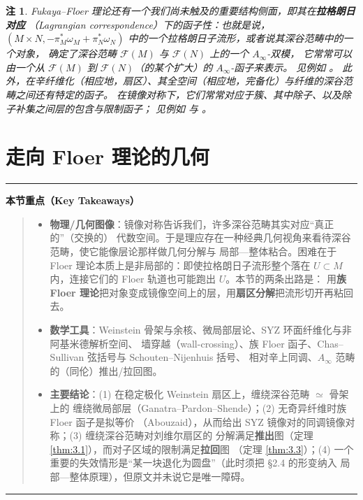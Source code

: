 \documentclass[UTF8,a4paper,11pt,fontset=windows]{ctexart}
\theoremstyle{cnthm}
\newtheorem{rem}[thm]{注}
\numberwithin{equation}{section}
\newenvironment{keytake}%
  {\par\medskip\noindent\rule{\linewidth}{0.5pt}\par\nopagebreak\vspace{3pt}%
   \noindent\textbf{本节重点（Key Takeaways）}\par\nopagebreak\vspace{2pt}%
   \begingroup\setlength{\topsep}{0pt}\setlength{\partopsep}{0pt}%
   \begin{quote}\small\setlength{\itemsep}{2pt}\setlength{\parskip}{0pt}}%
  {\end{quote}\endgroup\vspace{1pt}\noindent\rule{\linewidth}{0.5pt}\par\medskip}
\newcommand{\FF}{\mathcal{F}}         %
\begin{document}
\begin{rem}\label{rem:2.11}
Fukaya--Floer 理论还有一个我们尚未触及的重要结构侧面，即其在\textbf{拉格朗日对应}
（Lagrangian correspondence）下的函子性：也就是说，$(M\times N,-\pi^{*}_{M}\omega_{M}
+\pi^{*}_{N}\omega_{N})$ 中的一个拉格朗日子流形，或者说其深谷范畴中的一个对象，
确定了深谷范畴 $\FF(M)$ 与 $\FF(N)$ 上的一个 $A_\infty$-双模，
它常常可以由一个从 $\FF(M)$ 到 $\FF(N)$（的某个扩大）的 $A_\infty$-函子来表示。
见例如 \cite{r73,r43,r9}。
此外，在辛纤维化（相应地，扇区）、其全空间（相应地，完备化）与纤维的深谷范畴之间还有特定的函子。
在镜像对称下，它们常常对应于簇、其中除子、以及除子补集之间层的包含与限制函子；
见例如 \cite[第 5 节]{r20} 与 \cite{r99,r77,r23,r49,r62}。
\end{rem}



\section{走向 Floer 理论的几何}

\begin{keytake}
\begin{itemize}[leftmargin=1.3em,itemsep=2pt,topsep=0pt]
  \item \textbf{物理/几何图像}：镜像对称告诉我们，许多深谷范畴其实对应“真正的”（交换的）
        代数空间。于是理应存在一种经典几何视角来看待深谷范畴，使它能像层论那样做几何分解与
        局部—整体粘合。困难在于 Floer 理论本质上是非局部的：即使拉格朗日子流形整个落在
        $U\subset M$ 内，连接它们的 Floer 轨道也可能跑出 $U$。本节的两条出路是：
        用\textbf{族 Floer 理论}把对象变成镜像空间上的层，用\textbf{扇区分解}把流形切开再粘回去。
  \item \textbf{数学工具}：Weinstein 骨架与余核、微局部层论、SYZ 环面纤维化与非阿基米德解析空间、
        墙穿越（wall-crossing）、族 Floer 函子、Chas--Sullivan 弦括号与 Schouten--Nijenhuis 括号、
        相对辛上同调、$A_\infty$ 范畴的（同伦）推出/拉回图。
  \item \textbf{主要结论}：(1) 在稳定极化 Weinstein 扇区上，缠绕深谷范畴 $\simeq$ 骨架上的
        缠绕微局部层（Ganatra--Pardon--Shende）；(2) 无奇异纤维时族 Floer 函子是拟等价
        （Abouzaid），从而给出 SYZ 镜像对的同调镜像对称；(3) 缠绕深谷范畴对刘维尔扇区的
        分解满足\textbf{推出}图（定理 \ref{thm:3.1}），而对子区域的限制满足\textbf{拉回}图
        （定理 \ref{thm:3.3}）；(4) 一个重要的失效情形是“某一块退化为圆盘”（此时须把 §2.4 的形变纳入
        局部—整体原理），但原文并未说它是唯一障碍。
\end{itemize}
\end{keytake}
\end{document}
